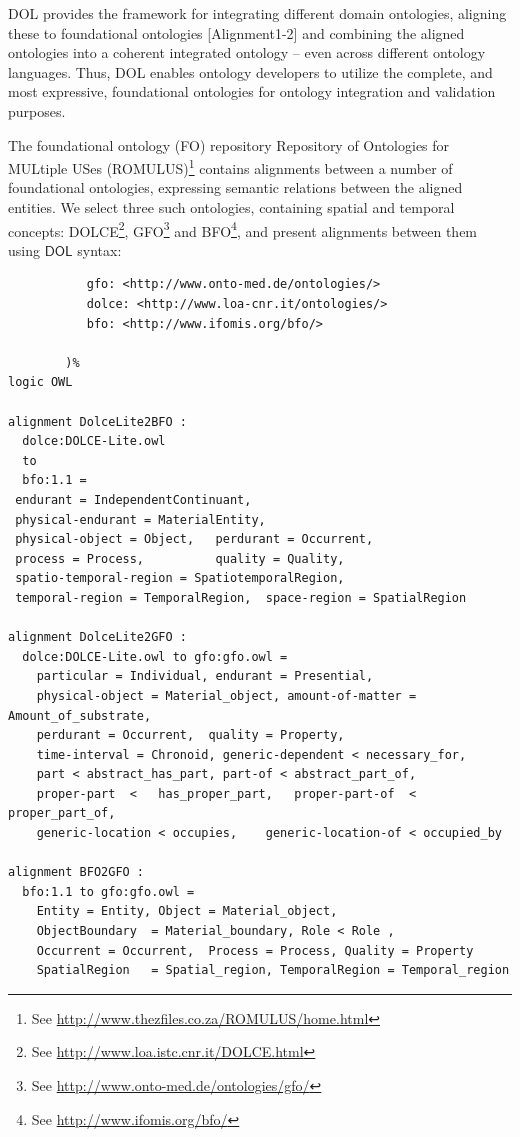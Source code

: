 \documentclass[10pt,fleqn,%
\ifpretendfinal
final%
\else
draft%
\fi,
]{scrreprt}
\newcommand*{\DOL}{\ensuremath{\mathsf{DOL}}\xspace}
\begin{document}
DOL  provides the framework for integrating different domain ontologies, aligning these to 
foundational ontologies [Alignment1-2] and combining the aligned ontologies into a coherent 
integrated ontology -- even across different ontology languages. Thus, DOL  enables ontology 
developers to utilize the complete, and most expressive, foundational ontologies for ontology 
integration and validation purposes. 

The foundational ontology (FO) repository Repository of Ontologies for MULtiple USes (ROMULUS)\footnote{See \url{http://www.thezfiles.co.za/ROMULUS/home.html}}
contains alignments between a number of foundational ontologies, expressing semantic relations between the aligned
entities. We select three such ontologies, containing spatial and temporal concepts: DOLCE\footnote{See \url{http://www.loa.istc.cnr.it/DOLCE.html}}, GFO\footnote{See \url{http://www.onto-med.de/ontologies/gfo/}} and BFO\footnote{See \url{http://www.ifomis.org/bfo/}}, and present alignments between them 
using \DOL syntax:

\begin{lstlisting}[basicstyle=\ttfamily\footnotesize,language=dolText,morekeywords={props,ObjectProperty,Class,DisjointUnionOf,SubClassOf,Characteristics,Transitive,Asymmetric,SubPropertyOf,DisjointClasses,EquivalentTo,inverse,only,forall,iff,if,or,exists,bridge,distributed,from},escapechar=@,mathescape]
%prefix(
           gfo: <http://www.onto-med.de/ontologies/>
           dolce: <http://www.loa-cnr.it/ontologies/>
           bfo: <http://www.ifomis.org/bfo/>
           
        )%
logic OWL

alignment DolceLite2BFO :
  dolce:DOLCE-Lite.owl
  to
  bfo:1.1 =
 endurant = IndependentContinuant,
 physical-endurant = MaterialEntity,
 physical-object = Object,   perdurant = Occurrent,
 process = Process,          quality = Quality,
 spatio-temporal-region = SpatiotemporalRegion,
 temporal-region = TemporalRegion,  space-region = SpatialRegion

alignment DolceLite2GFO :
  dolce:DOLCE-Lite.owl to gfo:gfo.owl =
 	particular = Individual, endurant = Presential,
 	physical-object = Material_object, amount-of-matter = Amount_of_substrate,
 	perdurant = Occurrent, 	quality = Property,
 	time-interval = Chronoid, generic-dependent < necessary_for,
 	part < abstract_has_part, part-of < abstract_part_of,
 	proper-part  <	 has_proper_part,  	proper-part-of  < proper_part_of,
 	generic-location < occupies, 	generic-location-of < occupied_by

alignment BFO2GFO :
  bfo:1.1 to gfo:gfo.owl =
	Entity = Entity, Object = Material_object,
	ObjectBoundary  = Material_boundary, Role < Role ,
 	Occurrent = Occurrent, 	Process = Process, Quality = Property
 	SpatialRegion 	= Spatial_region, TemporalRegion = Temporal_region 	
\end{lstlisting}
\end{document}
